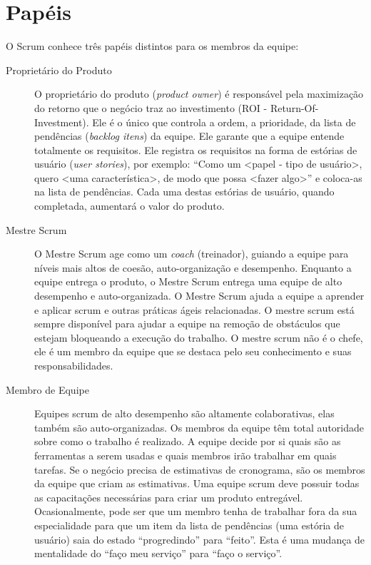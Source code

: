 \section{Papéis}
O Scrum conhece três papéis distintos para os membros da equipe:
\begin{description}
\item[Proprietário do Produto] O proprietário do produto (\emph{product owner}) é responsável pela maximização do retorno que o negócio traz ao investimento (ROI - Return-Of-Investment). Ele é o único que controla a ordem, a prioridade, da lista de pendências (\textit{backlog itens}) da equipe. Ele garante que a equipe entende totalmente os requisitos. Ele registra os requisitos na forma de estórias de usuário (\emph{user stories}), por exemplo: ``Como um <papel - tipo de usuário>, quero <uma característica>, de modo que possa <fazer algo>'' e coloca-as na lista de pendências. Cada uma destas estórias de usuário, quando completada, aumentará o valor do produto.

\item[Mestre Scrum] O Mestre Scrum age como um \textit{coach} (treinador), guiando a equipe para níveis mais altos de coesão, auto-organização e desempenho. Enquanto a equipe entrega o produto, o Mestre Scrum entrega uma equipe de alto desempenho e auto-organizada. O Mestre Scrum ajuda a equipe a aprender e aplicar scrum e outras práticas ágeis relacionadas. O mestre scrum está sempre disponível para ajudar a equipe na remoção de obstáculos que estejam bloqueando a execução do trabalho. O mestre scrum não é o chefe, ele é um membro da equipe que se destaca pelo seu conhecimento e suas responsabilidades.

\item[Membro de Equipe] Equipes scrum de alto desempenho são altamente colaborativas, elas também são auto-organizadas. Os membros da equipe têm total autoridade sobre como o trabalho é realizado. A equipe decide por si quais são as ferramentas a serem usadas e quais membros irão trabalhar em quais tarefas. Se o negócio precisa de estimativas de cronograma, são os membros da equipe que criam as estimativas. Uma equipe scrum deve possuir todas as capacitações necessárias para criar um produto entregável. Ocasionalmente, pode ser que um membro tenha de trabalhar fora da sua especialidade para que um item da lista de pendências (uma estória de usuário) saia do estado ``progredindo'' para ``feito''. Esta é uma mudança de mentalidade do ``faço meu serviço'' para ``faço o serviço''. 

\end{description}

